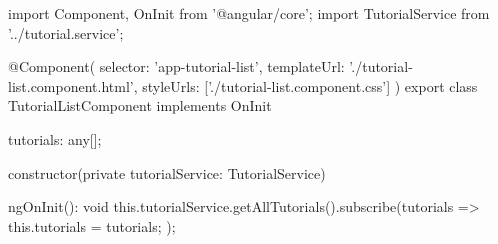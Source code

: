 import { Component, OnInit } from '@angular/core';
import { TutorialService } from '../tutorial.service';

@Component({
  selector: 'app-tutorial-list',
  templateUrl: './tutorial-list.component.html',
  styleUrls: ['./tutorial-list.component.css']
})
export class TutorialListComponent implements OnInit {
  
  tutorials: any[];
  
  constructor(private tutorialService: TutorialService) { }
  
  ngOnInit(): void {
    this.tutorialService.getAllTutorials().subscribe(tutorials => {
      this.tutorials = tutorials;
    });
  }
}